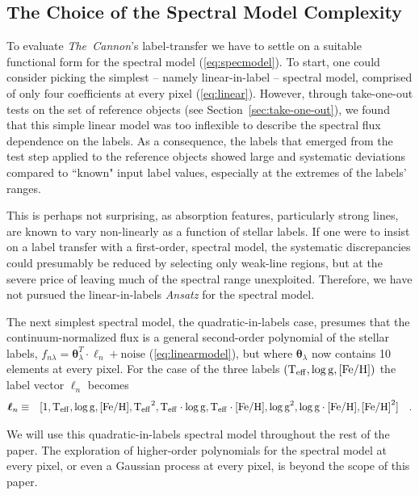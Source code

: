 \documentclass[12pt, preprint]{aastex}
\newcommand{\sectionname}{Section}
\newcommand{\tc}{\textsl{The~Cannon}}
\newcommand{\set}[1]{\bm{#1}}
\newcommand{\starlabel}{\ell}
\newcommand{\starlabelvec}{\set{\starlabel}}
\newcommand{\teff}{\mbox{$\rm T_{eff}$}}
\newcommand{\feh}{\mbox{$\rm [Fe/H]$}}
\newcommand{\logg}{\mbox{$\rm \log g$}}
\begin{document}
\subsection{The Choice of the Spectral Model Complexity}
\label{sec:ModelComplexity} 

To evaluate \tc 's label-transfer we have to settle on a suitable functional form for the spectral model (\ref{eq:specmodel}).
To start, one could consider picking the simplest -- namely linear-in-label -- spectral model, comprised of only four coefficients at every pixel (\ref{eq:linear}).
However, through take-one-out tests on the set of reference objects (see \sectionname~\ref{sec:take-one-out}), we found that this simple linear model was too inflexible to describe the spectral flux dependence on the labels.
As a consequence, the labels that emerged from the test step applied to the reference objects showed large and systematic deviations compared to ``known" input label values,
especially at the extremes of the labels' ranges. 

This is perhaps not surprising, as absorption features, particularly strong lines, are known to vary non-linearly as a function of stellar labels. If one were to insist on a label transfer with a first-order, spectral model, the systematic discrepancies could presumably be reduced by selecting only weak-line regions, but at the severe price of leaving much of the spectral range unexploited. Therefore, we have not pursued the linear-in-labels \textit{Ansatz} for the spectral model.

The next simplest spectral model, the quadratic-in-labels case,
 presumes that the continuum-normalized flux is a general second-order polynomial of the stellar labels, $f_{n\lambda} =
\set{\theta}_\lambda^T \cdot \starlabelvec_n + \mbox{noise}$ 
(\ref{eq:linearmodel}), 
but where $\set{\theta}_\lambda$ now contains 10 elements at every pixel.
For the case of the three labels $(\teff , \logg , \feh)$ the label vector $\starlabelvec_n$
becomes  
\begin{eqnarray}
\starlabelvec_n &\equiv&
[1, \teff, \logg, \feh, \teff^2, \teff\cdot\logg, \teff\cdot\feh, \logg^2, \logg\cdot\feh, \feh^2]
 \label{eq:quadinthreelabels}\quad.
\end{eqnarray}


We will use this quadratic-in-labels spectral model throughout the rest of the paper.  The exploration of higher-order polynomials for the spectral model at every pixel, or even a Gaussian process at every pixel, is beyond the scope of this paper. 
 
\end{document}
